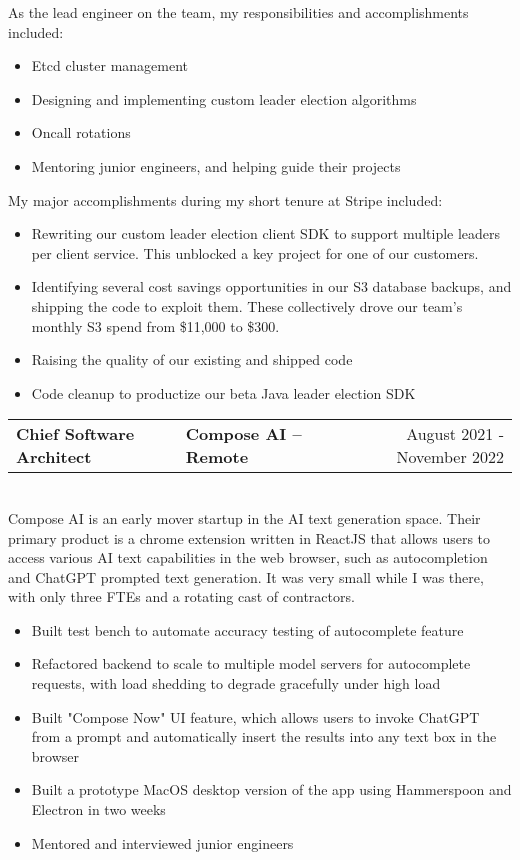 \documentclass{res}
\newlength{\vsep}
\begin{document}
\begin{resume}
   As the lead engineer on the team, my responsibilities and accomplishments included:
   \begin{itemize}
   \item Etcd cluster management
   \item Designing and implementing custom leader election algorithms
   \item Oncall rotations
   \item Mentoring junior engineers, and helping guide their projects
   \end{itemize}
   My major accomplishments during my short tenure at Stripe included:
   \begin{itemize}
   \item Rewriting our custom leader election client SDK to support multiple leaders per client service. This unblocked a key project for one of our customers.
   \item Identifying several cost savings opportunities in our S3 database backups, and shipping the code to exploit them. These collectively drove our team's monthly S3 spend from \$11,000 to \$300.
   \item Raising the quality of our existing and shipped code
   \item Code cleanup to productize our beta Java leader election SDK
   \end{itemize}
   \vspace{\vsep}

   \begin{tabularx}{\textwidth}{@{}>{\bf}l>{\large\bf\centering\arraybackslash}Xr@{}}
   Chief Software Architect & Compose AI -- Remote & August 2021 - November 2022\vspace{\vsep}\\
   \end{tabularx}\\
   Compose AI is an early mover startup in the AI text generation space.  Their primary product is a chrome extension written in ReactJS that allows users to access various AI text capabilities in the web browser, such as autocompletion and ChatGPT prompted text generation.  It was very small while I was there, with only three FTEs and a rotating cast of contractors.
   \begin{itemize}
   \item Built test bench to automate accuracy testing of autocomplete feature
   \item Refactored backend to scale to multiple model servers for autocomplete requests, with load shedding to degrade gracefully under high load
   \item Built "Compose Now" UI feature, which allows users to invoke ChatGPT from a prompt and automatically insert the results into any text box in the browser
   \item Built a prototype MacOS desktop version of the app using Hammerspoon and Electron in two weeks
   \item Mentored and interviewed junior engineers
   \end{itemize}
   \vspace{\vsep}


\end{resume}
\end{document}
